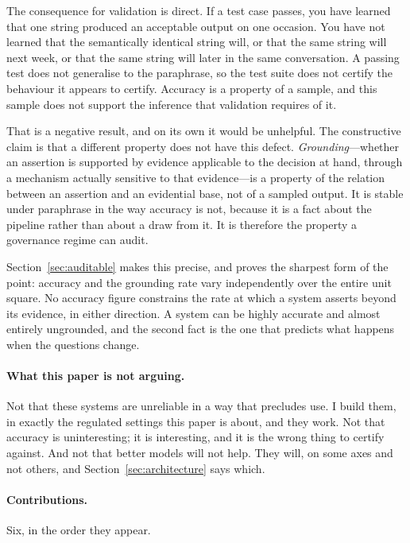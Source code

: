 \documentclass[11pt]{article}
\theoremstyle{plain}
\theoremstyle{definition}
\begin{document}
The consequence for validation is direct. If a test case passes, you have
learned that one string produced an acceptable output on one occasion. You have
not learned that the semantically identical string will, or that the same string
will next week, or that the same string will later in the same conversation. A
passing test does not generalise to the paraphrase, so the test suite does not
certify the behaviour it appears to certify. Accuracy is a property of a sample,
and this sample does not support the inference that validation requires of it.

That is a negative result, and on its own it would be unhelpful. The
constructive claim is that a different property does not have this defect.
\emph{Grounding}---whether an assertion is supported by evidence applicable to
the decision at hand, through a mechanism actually sensitive to that
evidence---is a property of the relation between an assertion and an evidential
base, not of a sampled output. It is stable under paraphrase in the way accuracy
is not, because it is a fact about the pipeline rather than about a draw from it.
It is therefore the property a governance regime can audit.

Section~\ref{sec:auditable} makes this precise, and proves the sharpest form of
the point: accuracy and the grounding rate vary independently over the entire
unit square. No accuracy figure constrains the rate at which a system asserts
beyond its evidence, in either direction. A system can be highly accurate and
almost entirely ungrounded, and the second fact is the one that predicts what
happens when the questions change.

\paragraph{What this paper is not arguing.} Not that these systems are
unreliable in a way that precludes use. I build them, in exactly the regulated
settings this paper is about, and they work. Not that accuracy is uninteresting;
it is interesting, and it is the wrong thing to certify against. And not that
better models will not help. They will, on some axes and not others, and
Section~\ref{sec:architecture} says which.

\paragraph{Contributions.} Six, in the order they appear.
\end{document}
